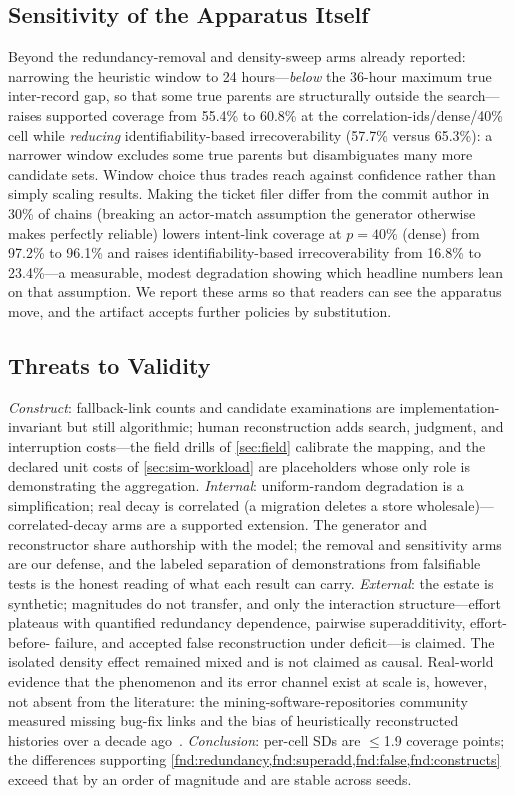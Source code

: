 \subsection{Sensitivity of the Apparatus Itself}
\label{sec:sim-sensitivity}
Beyond the redundancy-removal and density-sweep arms already reported:
narrowing the heuristic window to 24 hours---\emph{below} the 36-hour maximum
true inter-record gap, so that some true parents are structurally outside the
search---raises supported coverage from 55.4\% to 60.8\% at the
correlation-ids/dense/40\% cell while \emph{reducing} identifiability-based
irrecoverability (57.7\% versus 65.3\%): a narrower window excludes some true
parents but disambiguates many more candidate sets. Window choice thus trades
reach against confidence rather than simply scaling results. Making the
ticket filer differ from the commit author in 30\% of chains (breaking an
actor-match assumption the generator otherwise makes perfectly reliable)
lowers intent-link coverage at $p{=}40\%$ (dense) from 97.2\% to 96.1\% and
raises identifiability-based irrecoverability from 16.8\% to 23.4\%---a
measurable, modest degradation showing which headline numbers lean on that
assumption. We report these arms so that readers can see the apparatus move,
and the artifact accepts further policies by substitution.

\subsection{Threats to Validity}
\label{sec:sim-threats}
\emph{Construct}: fallback-link counts and candidate examinations are
implementation-invariant but still algorithmic; human reconstruction adds
search, judgment, and interruption costs---the field drills of \cref{sec:field}
calibrate the mapping, and the declared unit costs of \cref{sec:sim-workload}
are placeholders whose only role is demonstrating the aggregation.
\emph{Internal}: uniform-random degradation is a simplification; real decay is
correlated (a migration deletes a store wholesale)---correlated-decay arms are
a supported extension. The generator and reconstructor share authorship with
the model; the removal and sensitivity arms are our defense, and the labeled
separation of demonstrations from falsifiable tests is the honest reading of
what each result can carry. \emph{External}: the estate is synthetic;
magnitudes do not transfer, and only the interaction structure---effort plateaus
with quantified redundancy dependence, pairwise superadditivity, effort-before-%
failure, and accepted false reconstruction under deficit---is claimed. The isolated
density effect remained mixed and is not claimed as causal.
Real-world evidence that the phenomenon and its error channel exist at scale
is, however, not absent from the literature: the mining-software-repositories
community measured missing bug-fix links and the bias of heuristically
reconstructed histories over a decade ago~\cite{bachmann2010,bird2009}.
\emph{Conclusion}: per-cell SDs are $\le$1.9 coverage points; the differences
supporting \cref{fnd:redundancy,fnd:superadd,fnd:false,fnd:constructs} exceed
that by an order of magnitude and are stable across seeds.
